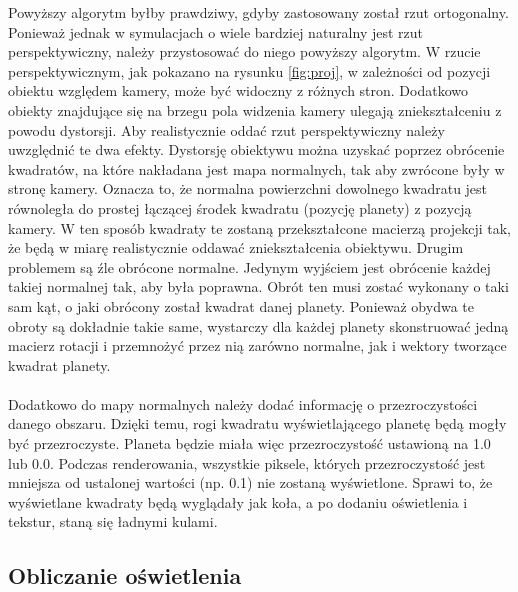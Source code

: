 Powyższy algorytm byłby prawdziwy, gdyby zastosowany został rzut ortogonalny. Ponieważ jednak w symulacjach o wiele bardziej naturalny jest rzut perspektywiczny, należy przystosować do niego powyższy algorytm. W rzucie perspektywicznym, jak pokazano na rysunku \hyperref[fig:proj]{\ref*{fig:proj}}, w zależności od pozycji obiektu względem kamery, może być widoczny z różnych stron. Dodatkowo obiekty znajdujące się na brzegu pola widzenia kamery ulegają zniekształceniu z powodu dystorsji. Aby realistycznie oddać rzut perspektywiczny należy uwzględnić te dwa efekty. Dystorsję obiektywu można uzyskać poprzez obrócenie kwadratów, na które nakładana jest mapa normalnych, tak aby zwrócone były w stronę kamery. Oznacza to, że normalna powierzchni dowolnego kwadratu jest równoległa do prostej łączącej środek kwadratu (pozycję planety) z pozycją kamery. W ten sposób kwadraty te zostaną przekształcone macierzą projekcji tak, że będą w miarę realistycznie oddawać zniekształcenia obiektywu. Drugim problemem są źle obrócone normalne. Jedynym wyjściem jest obrócenie każdej takiej normalnej tak, aby była poprawna. Obrót ten musi zostać wykonany o taki sam kąt, o jaki obrócony został kwadrat danej planety. Ponieważ obydwa te obroty są dokładnie takie same, wystarczy dla każdej planety skonstruować jedną macierz rotacji i przemnożyć przez nią zarówno normalne, jak i wektory tworzące kwadrat planety.


\paragraph{}

Dodatkowo do mapy normalnych należy dodać informację o przezroczystości danego obszaru. Dzięki temu, rogi kwadratu wyświetlającego planetę będą mogły być przezroczyste. Planeta będzie miała więc przezroczystość ustawioną na 1.0 lub 0.0. Podczas renderowania, wszystkie piksele, których przezroczystość jest mniejsza od ustalonej wartości (np. 0.1) nie zostaną wyświetlone. Sprawi to, że wyświetlane kwadraty będą wyglądały jak koła, a po dodaniu oświetlenia i tekstur, staną się ładnymi kulami.

\subsection{Obliczanie oświetlenia}\label{sub:obliczanie oświetlenia}
\paragraph{}

